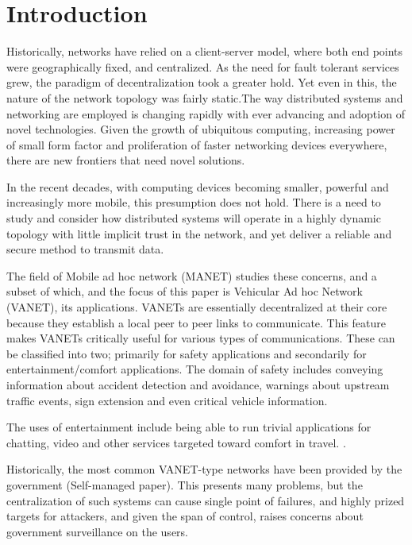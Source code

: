 \section{Introduction}

Historically, networks have relied on a client-server model, where both end points
were geographically fixed, and centralized. As the need for fault tolerant services
grew, the paradigm of decentralization took a greater hold. Yet even in this, the nature of the network topology was fairly static.The way distributed systems and networking are employed is changing rapidly with ever advancing and adoption of novel technologies. Given the growth of ubiquitous computing, increasing power of small form factor and proliferation of faster networking devices everywhere, there are new frontiers that need novel solutions. 

In the recent decades, with computing devices becoming smaller, powerful and increasingly more mobile, this presumption does not hold. There is a need to study and consider how distributed systems will operate in a highly dynamic topology with little implicit trust in the network, and yet deliver a reliable and secure method to transmit data.

The field of Mobile ad hoc network (MANET) studies these concerns, and a subset of which, and the focus of this paper is Vehicular Ad hoc Network (VANET), its applications. VANETs are essentially decentralized at their core because they establish a local peer to peer links to communicate. This feature makes VANETs critically useful for various types of communications. These can be classified into two; primarily for safety applications and secondarily for entertainment/comfort applications. The domain of safety includes conveying information about accident detection and avoidance, warnings about upstream traffic events, sign extension and even critical vehicle information. \cite{kumar2013applications}

The uses of entertainment include being able to run trivial applications for chatting, video and other services targeted toward comfort in travel.
\cite{al2014comprehensive}. 

Historically, the most common VANET-type networks have been provided by the government (Self-managed paper). This presents many problems, but the centralization of such systems can cause single point of failures, and highly prized targets for attackers, and given the span of control, raises concerns about government surveillance on the users. \cite{leiding2016self}

